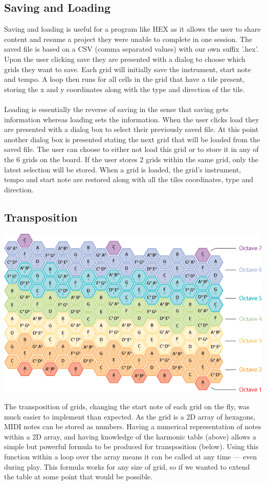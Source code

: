 \documentclass[10pt,a4paper]{article}
\begin{document}
\subsection{Saving and Loading}
Saving and loading is useful for a program like HEX as it allows the user to share content and resume a project they were unable to complete in one session. The saved file is based on a CSV (comma separated values) with our own suffix '.hex'. Upon the user clicking save they are presented with a dialog to choose which grids they want to save. Each grid will initially save the instrument, start note and tempo. A loop then runs for all cells in the grid that have a tile present, storing the x and y coordinates along with the type and direction of the tile.\\
\\
Loading is essentially the reverse of saving in the sense that saving gets information whereas loading sets the information. When the user clicks load they are presented with a dialog box to select their previously saved file. At this point another dialog box is presented stating the next grid that will be loaded from the saved file. The user can choose to either not load this grid or to store it in any of the 6 grids on the board. If the user stores 2 grids within the same grid, only the latest selection will be stored. When a grid is loaded, the grid's instrument, tempo and start note are restored along with all the tiles coordinates, type and direction.

\subsection{Transposition}
\begin{center}
\includegraphics[scale=0.5]{7.png}
\end{center}
The transposition of grids, changing the start note of each grid on the fly, was much easier to implement than expected. As the grid is a 2D array of hexagons, MIDI notes can be stored as numbers. Having a numerical representation of notes within a 2D array, and having knowledge of the harmonic table (above) allows a simple but powerful formula to be produced for transposition (below). Using this function within a loop over the array means it can be called at any time --- even during play. This formula works for any size of grid, so if we wanted to extend the table at some point that would be possible. \\
\end{document}
